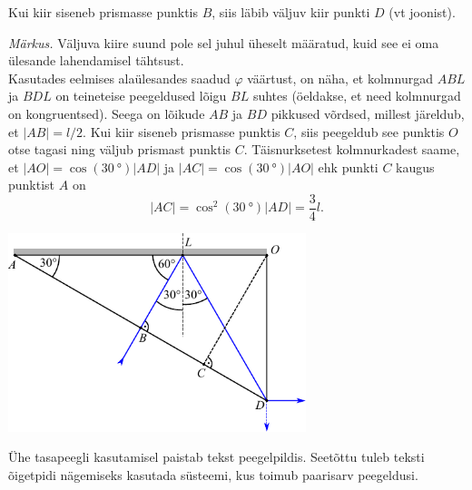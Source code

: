 {\osa Kui kiir siseneb prismasse punktis $B$, siis läbib väljuv kiir punkti $D$ (vt joonist).

\emph{Märkus.} Väljuva kiire suund pole sel juhul üheselt määratud, kuid see ei oma ülesande lahendamisel tähtsust.\\
Kasutades eelmises alaülesandes saadud $\varphi$ väärtust, on näha, et kolmnurgad $ABL$ ja $BDL$ on teineteise peegeldused lõigu $BL$ suhtes (öeldakse, et need kolmnurgad on kongruentsed). Seega on lõikude $AB$ ja $BD$ pikkused võrdsed, millest järeldub, et $|AB|=l/2$. Kui kiir siseneb prismasse punktis $C$, siis peegeldub see punktis $O$ otse tagasi ning väljub prismast punktis $C$. Täisnurksetest kolmnurkadest saame, et $|AO|=\cos(\SI{30}{\degree})|AD|$ ja $|AC|=\cos(\SI{30}{\degree})|AO|$ ehk punkti $C$ kaugus punktist $A$ on 
\[
|AC|=\cos^2(\SI{30}{\degree})|AD|=\frac{3}{4}l.
\]

\begin{center}
 \includegraphics[width=0.65\textwidth]{2014-v3g-04-periskoopprillid_lahendus_joonis3.pdf}
\end{center}

\osa Ühe tasapeegli kasutamisel paistab tekst peegelpildis. Seetõttu tuleb teksti õigetpidi nägemiseks kasutada süsteemi, kus toimub paarisarv peegeldusi.
\fi


}
